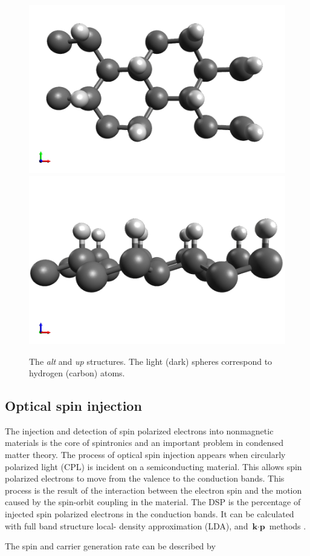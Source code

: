 \documentclass[pss]{wiley2sp} %
\begin{document}
\begin{figure}[t]
{\includegraphics[width=0.49\linewidth]{strc/up1}
 \includegraphics[width=0.49\linewidth]{strc/up2}}
\caption{The \emph{alt} and \emph{up} structures. The light
(dark) spheres correspond to hydrogen (carbon) atoms.\label{fig:structures}}
\end{figure}

\subsection{Optical spin injection}\label{sec:theory-DSP}

The injection and detection of spin polarized electrons into nonmagnetic
materials is the core of spintronics \cite{vzuticRMP04,%
fertRMP08,pezzoliSPIE12,bottegoniPRB13} and an important 
problem in condensed matter
theory. The process of optical spin injection appears when circularly
polarized light (CPL) \cite{dyakonovOO84} is incident on a
semiconducting material. This allows spin polarized electrons to move from the
valence to the conduction bands. This process is the result of the interaction
between the electron spin and the motion caused by the spin-orbit coupling in
the material. The DSP is the percentage of injected spin polarized electrons
in the conduction bands. It can be calculated with full band structure local-
density approximation (LDA), and $\textbf{k}\cdot\textbf{p}$ methods
\cite{nastosPRB07,cabellosPRB09}.

The spin and carrier generation rate can be described by 
\end{document}
